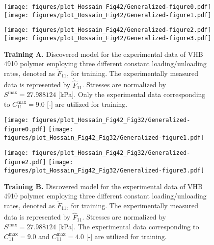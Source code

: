 %
\begin{figure}[h]
    \centering
    \hspace*{1cm}
    
    \vspace*{-1.2cm}
    
    \texttt{[image: figures/plot\_Hossain\_Fig42/Generalized-figure0.pdf]}
    \texttt{[image: figures/plot\_Hossain\_Fig42/Generalized-figure1.pdf]}

    \texttt{[image: figures/plot\_Hossain\_Fig42/Generalized-figure2.pdf]}
    \texttt{[image: figures/plot\_Hossain\_Fig42/Generalized-figure3.pdf]}    
    \caption{\textbf{Training A.} Discovered model for the experimental data of VHB 4910 polymer \cite{hossain2012} employing three different constant loading/unloading rates, denoted as $\dot{F}_{11}$, for training. The experimentally measured data is represented by $\dot{\hat{F}}_{11}$. Stresses are normalized by $ S^{\text{max}} = 27.988124 $ [kPa]. Only the experimental data corresponding to $ C_{11}^{\text{max}} = 9.0 $ [-] are utilized for training.}
    \label{fig:Hossain2012_training_A}
\end{figure}
%
\begin{figure}[h]
    \centering
    \hspace*{1cm}
    
    \vspace*{-1.2cm}
    
    \texttt{[image: figures/plot\_Hossain\_Fig42\_Fig32/Generalized-figure0.pdf]}
    \texttt{[image: figures/plot\_Hossain\_Fig42\_Fig32/Generalized-figure1.pdf]}

    \texttt{[image: figures/plot\_Hossain\_Fig42\_Fig32/Generalized-figure2.pdf]}
    \texttt{[image: figures/plot\_Hossain\_Fig42\_Fig32/Generalized-figure3.pdf]}    
    \caption{\textbf{Training B.} Discovered model for the experimental data of VHB 4910 polymer \cite{hossain2012} employing three different constant loading/unloading rates, denoted as $\dot{F}_{11}$, for training. The experimentally measured data is represented by $\dot{\hat{F}}_{11}$. Stresses are normalized by $ S^{\text{max}} = 27.988124 $ [kPa]. The experimental data corresponding to $ C_{11}^{\text{max}} = 9.0 $ and $ C_{11}^{\text{max}} = 4.0 $ [-] are utilized for training.}
    \label{fig:Hossain2012_training_B}
\end{figure}
%
\FloatBarrier
